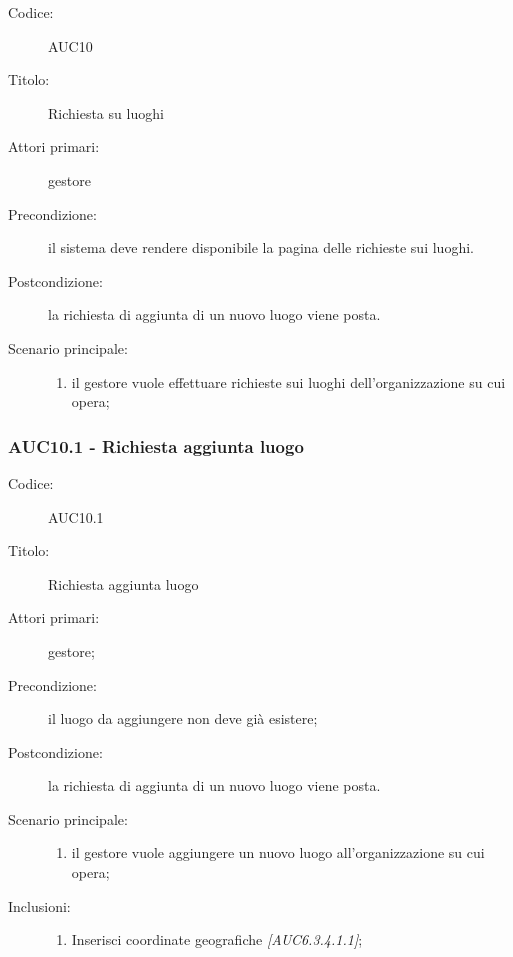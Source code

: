 \documentclass[casi-duso]{subfiles}
\begin{document}
\begin{description}
  \item[Codice:] AUC10
  \item[Titolo:] Richiesta su luoghi
  \item[Attori primari:] gestore
  \item[Precondizione:] il sistema deve rendere disponibile la pagina delle richieste sui luoghi.
  \item[Postcondizione:] la richiesta di aggiunta di un nuovo luogo viene posta.
  \item[Scenario principale:]
  \begin{enumerate}
    \item il gestore vuole effettuare richieste sui luoghi dell'organizzazione su cui opera;
  \end{enumerate}
\end{description}

\subsubsection{AUC10.1 - Richiesta aggiunta luogo}%
\label{subsub:AUC10.1}
\begin{description}
  \item[Codice:] AUC10.1
  \item[Titolo:] Richiesta aggiunta luogo
  \item[Attori primari:] gestore;
  \item[Precondizione:] il luogo da aggiungere non deve già esistere;
  \item[Postcondizione:] la richiesta di aggiunta di un nuovo luogo viene posta.
  \item[Scenario principale:]
  \begin{enumerate}
    \item il gestore vuole aggiungere un nuovo luogo all'organizzazione su cui opera;
  \end{enumerate}
  \item[Inclusioni:]
  \begin{enumerate}
    \item Inserisci coordinate geografiche \emph{[AUC6.3.4.1.1]};
  \end{enumerate}
\end{description}
\end{document}
